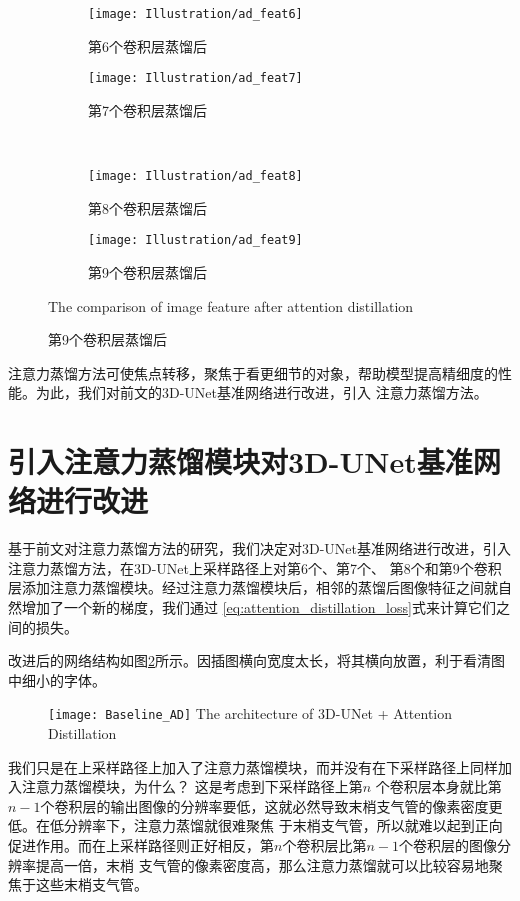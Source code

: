 \begin{figure}[!htp]
	\centering
	\begin{subfigure}{0.45\textwidth}
		\texttt{[image: Illustration/ad\_feat6]}
		\caption{第6个卷积层蒸馏后}
	\end{subfigure}
	\hfill
	\begin{subfigure}{0.45\textwidth}
		\texttt{[image: Illustration/ad\_feat7]}
		\caption{第7个卷积层蒸馏后}
	\end{subfigure}
	\\
	\begin{subfigure}{0.45\textwidth}
		\texttt{[image: Illustration/ad\_feat8]}
		\caption{第8个卷积层蒸馏后}
	\end{subfigure}
	\hfill
	\begin{subfigure}{0.45\textwidth}
		\texttt{[image: Illustration/ad\_feat9]}
		\caption{第9个卷积层蒸馏后}
	\end{subfigure}
        {The comparison of image feature after attention distillation}
	\label{tbl:ad_effect}
\end{figure}

注意力蒸馏方法可使焦点转移，聚焦于看更细节的对象，帮助模型提高精细度的性能。为此，我们对前文的3D-UNet基准网络进行改进，引入
注意力蒸馏方法。

\section{引入注意力蒸馏模块对3D-UNet基准网络进行改进}
基于前文对注意力蒸馏方法的研究，我们决定对3D-UNet基准网络进行改进，引入注意力蒸馏方法，在3D-UNet上采样路径上对第6个、第7个、
第8个和第9个卷积层添加注意力蒸馏模块。经过注意力蒸馏模块后，相邻的蒸馏后图像特征之间就自然增加了一个新的梯度，我们通过
\ref{eq:attention_distillation_loss}式来计算它们之间的损失。

改进后的网络结构如图\ref{fig:3dunet_ad}所示。因插图横向宽度太长，将其横向放置，利于看清图中细小的字体。
\begin{figure}[!ht]
    \centering
    \texttt{[image: Baseline\_AD]}
        {The architecture of 3D-UNet + Attention Distillation}
    \label{fig:3dunet_ad}
\end{figure}
我们只是在上采样路径上加入了注意力蒸馏模块，而并没有在下采样路径上同样加入注意力蒸馏模块，为什么？ 这是考虑到下采样路径上第$n$
个卷积层本身就比第$n-1$个卷积层的输出图像的分辨率要低，这就必然导致末梢支气管的像素密度更低。在低分辨率下，注意力蒸馏就很难聚焦
于末梢支气管，所以就难以起到正向促进作用。而在上采样路径则正好相反，第$n$个卷积层比第$n-1$个卷积层的图像分辨率提高一倍，末梢
支气管的像素密度高，那么注意力蒸馏就可以比较容易地聚焦于这些末梢支气管。

